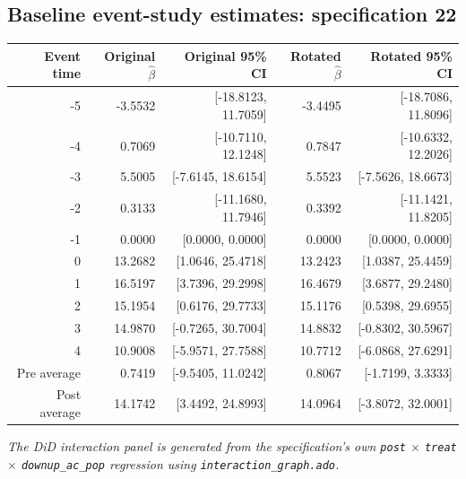 \documentclass[10pt]{article}
\begin{document}
\subsection*{Baseline event-study estimates: specification 22}
\begin{center}
\scriptsize
\begin{tabular}{r rr rr}
\toprule
Event time & Original $\hat\beta$ & Original 95\% CI & Rotated $\hat\beta$ & Rotated 95\% CI \\
\midrule
-5 & -3.5532 & [-18.8123, 11.7059] & -3.4495 & [-18.7086, 11.8096] \\
-4 & 0.7069 & [-10.7110, 12.1248] & 0.7847 & [-10.6332, 12.2026] \\
-3 & 5.5005 & [-7.6145, 18.6154] & 5.5523 & [-7.5626, 18.6673] \\
-2 & 0.3133 & [-11.1680, 11.7946] & 0.3392 & [-11.1421, 11.8205] \\
-1 & 0.0000 & [0.0000, 0.0000] & 0.0000 & [0.0000, 0.0000] \\
0 & 13.2682 & [1.0646, 25.4718] & 13.2423 & [1.0387, 25.4459] \\
1 & 16.5197 & [3.7396, 29.2998] & 16.4679 & [3.6877, 29.2480] \\
2 & 15.1954 & [0.6176, 29.7733] & 15.1176 & [0.5398, 29.6955] \\
3 & 14.9870 & [-0.7265, 30.7004] & 14.8832 & [-0.8302, 30.5967] \\
4 & 10.9008 & [-5.9571, 27.7588] & 10.7712 & [-6.0868, 27.6291] \\
\midrule
Pre average & 0.7419 & [-9.5405, 11.0242] & 0.8067 & [-1.7199, 3.3333] \\
Post average & 14.1742 & [3.4492, 24.8993] & 14.0964 & [-3.8072, 32.0001] \\
\bottomrule
\end{tabular}
\end{center}
\medskip
\textit{The DiD interaction panel is generated from the specification's own \texttt{post} $\times$ \texttt{treat} $\times$ \texttt{downup\_ac\_pop} regression using \texttt{interaction\_graph.ado}.}
\clearpage
\end{document}
